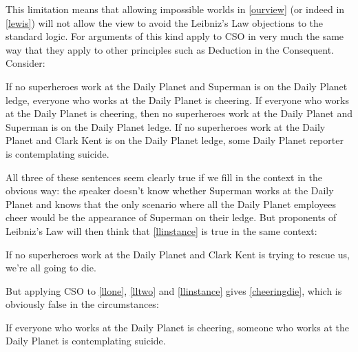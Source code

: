 \documentclass[If.tex]{subfiles}
\begin{document}
This limitation means that allowing impossible worlds in \ref{ourview} (or indeed in \ref{lewis}) will not allow the view to avoid the Leibniz's Law objections to the standard logic. For arguments of this kind apply to CSO in very much the same way that they apply to other principles such as Deduction in the Consequent.  Consider:
\begin{prop}
    \nitem
    \begin{prop}
    \aitem \label{llone}
	If no superheroes work at the Daily Planet and Superman is on the Daily Planet ledge, everyone who works at the Daily Planet is cheering.
	\aitem \label{lltwo}
	If everyone who works at the Daily Planet is cheering, then no superheroes work at the Daily Planet and Superman is on the Daily Planet ledge.
	\aitem \label{llthree}
	If no superheroes work at the Daily Planet and Clark Kent is on the Daily Planet ledge, some Daily Planet reporter is contemplating suicide. 
    \end{prop}
\end{prop}
All three of these sentences seem clearly true if we fill in the context in the obvious way: the speaker doesn't know whether Superman works at the Daily Planet and knows that the only scenario where all the Daily Planet employees cheer would be the appearance of Superman on their ledge.  But proponents of Leibniz's Law will then think that \ref{llinstance} is true in the same context: 
\begin{prop}
    \nitem \label{llinstance}
    If no superheroes work at the Daily Planet and Clark Kent is trying to rescue us, we're all going to die. 
\end{prop}
But applying CSO to \ref{llone}, \ref{lltwo} and \ref{llinstance} gives  \ref{cheeringdie}, which is obviously false in the circumstances:
\begin{prop}
	\nitem \label{cheeringdie}
	If everyone who works at the Daily Planet is cheering, someone who works at the Daily Planet is contemplating suicide.	
\end{prop}
\end{document}
